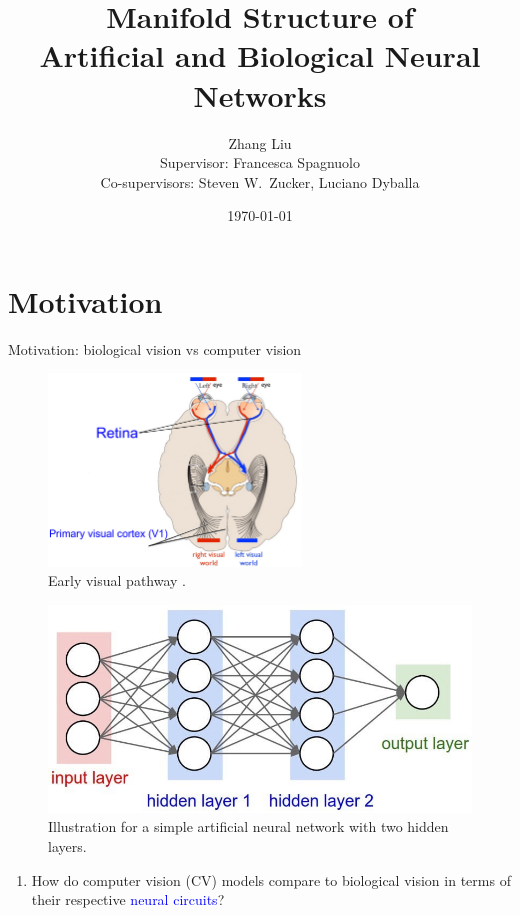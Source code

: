 \documentclass[xcolor={dvipsnames,svgnames}]{beamer}
\title{Manifold Structure of \\Artificial and Biological Neural Networks}
\author{Zhang Liu\\ Supervisor: Francesca Spagnuolo \\ Co-supervisors: Steven W.~Zucker, Luciano Dyballa}
\date{\today}
\begin{document}
\begin{frame}
\titlepage
\end{frame}

\section{Motivation}

\begin{frame}{Motivation: biological vision vs computer vision}
\begin{minipage}[t]{.58\linewidth}  
\begin{figure}
\includegraphics[width=0.6\textwidth]{figures/intro/visual-pathway.jpg}
\caption{Early visual pathway \cite{pillow_vision_2022}.}
\end{figure} 
\end{minipage}
\begin{minipage}[t]{.4\linewidth}   
\begin{figure}         \includegraphics[width=\textwidth]{figures/intro/simple-ann.jpeg}
\caption{Illustration for a simple artificial neural network with two hidden layers.}
\end{figure} 
\end{minipage}
\begin{enumerate}
    \item How do computer vision (CV) models compare to biological vision in terms of their respective \textcolor{blue}{neural circuits}?
    

\end{enumerate}
\end{frame}
\end{document}
